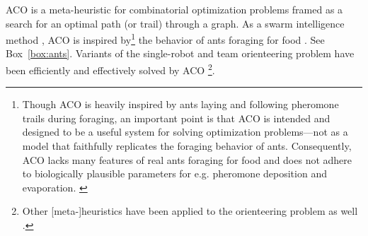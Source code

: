 \documentclass[11pt, oneside]{article}
\begin{document}
ACO \cite{dorigo2006ant,bonabeau1999swarm,blum2005ant} is a meta-heuristic for combinatorial optimization problems framed as a search for an optimal path (or trail) through a graph.
As a swarm intelligence method \cite{bonabeau1999swarm}, ACO is inspired by\footnote{
Though ACO is heavily inspired by ants laying and following pheromone trails during foraging, an important point is that ACO is intended and designed to be a useful system for solving optimization problems---not as a model that faithfully replicates the foraging behavior of ants. 
Consequently, ACO lacks many features of real ants foraging for food and does not adhere to biologically plausible parameters for e.g. pheromone deposition and evaporation. \cite{bonabeau1999swarm}
}
 the behavior of ants foraging for food \cite{bonabeau2000inspiration}. See Box~\ref{box:ants}. 
Variants of the single-robot and team orienteering problem have been efficiently and effectively solved by ACO \cite{ke2008ants,chen2015multiobjective,verbeeck2017time,sohrabi2021acs,chen2022environment}\footnote{Other [meta-]heuristics have been applied to the orienteering problem as well \cite{gavalas2014survey,dang2013effective,chao1996fast,butt1994heuristic}.}.
\end{document}
